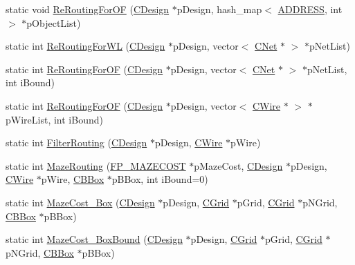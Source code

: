 \begin{DoxyCompactItemize}
\item 
static void \mbox{\hyperlink{classCGRouter_a1fd03b63f72447aa7085e3320ba6c7ff}{Re\+Routing\+For\+OF}} (\mbox{\hyperlink{classCDesign}{C\+Design}} $\ast$p\+Design, hash\+\_\+map$<$ \mbox{\hyperlink{BoxRouter_8h_a280feb883e9d4a7edcc69c8bcb9f38f2}{A\+D\+D\+R\+E\+SS}}, int $>$ $\ast$p\+Object\+List)
\item 
static int \mbox{\hyperlink{classCGRouter_a35bb814cd4191e640f1aecde4e5726ea}{Re\+Routing\+For\+WL}} (\mbox{\hyperlink{classCDesign}{C\+Design}} $\ast$p\+Design, vector$<$ \mbox{\hyperlink{classCNet}{C\+Net}} $\ast$ $>$ $\ast$p\+Net\+List)
\item 
static int \mbox{\hyperlink{classCGRouter_a57a58eb17ab26199bc5ec9d202ecdb80}{Re\+Routing\+For\+OF}} (\mbox{\hyperlink{classCDesign}{C\+Design}} $\ast$p\+Design, vector$<$ \mbox{\hyperlink{classCNet}{C\+Net}} $\ast$ $>$ $\ast$p\+Net\+List, int i\+Bound)
\item 
static int \mbox{\hyperlink{classCGRouter_a6f3bca0f272874e1ceb57fff94ddf921}{Re\+Routing\+For\+OF}} (\mbox{\hyperlink{classCDesign}{C\+Design}} $\ast$p\+Design, vector$<$ \mbox{\hyperlink{classCWire}{C\+Wire}} $\ast$ $>$ $\ast$p\+Wire\+List, int i\+Bound)
\item 
static int \mbox{\hyperlink{classCGRouter_ae04faf8e6971cdf55b7314471369e61e}{Filter\+Routing}} (\mbox{\hyperlink{classCDesign}{C\+Design}} $\ast$p\+Design, \mbox{\hyperlink{classCWire}{C\+Wire}} $\ast$p\+Wire)
\item 
static int \mbox{\hyperlink{classCGRouter_a4bbedf7ca84154f7c153874fb979c068}{Maze\+Routing}} (\mbox{\hyperlink{GRouter_8h_a7bce1c983b0974505feefa8727066acb}{F\+P\+\_\+\+M\+A\+Z\+E\+C\+O\+ST}} $\ast$p\+Maze\+Cost, \mbox{\hyperlink{classCDesign}{C\+Design}} $\ast$p\+Design, \mbox{\hyperlink{classCWire}{C\+Wire}} $\ast$p\+Wire, \mbox{\hyperlink{classCBBox}{C\+B\+Box}} $\ast$p\+B\+Box, int i\+Bound=0)
\item 
static int \mbox{\hyperlink{classCGRouter_a175e2e50a21411c968fdd51eb280615a}{Maze\+Cost\+\_\+\+Box}} (\mbox{\hyperlink{classCDesign}{C\+Design}} $\ast$p\+Design, \mbox{\hyperlink{classCGrid}{C\+Grid}} $\ast$p\+Grid, \mbox{\hyperlink{classCGrid}{C\+Grid}} $\ast$p\+N\+Grid, \mbox{\hyperlink{classCBBox}{C\+B\+Box}} $\ast$p\+B\+Box)
\item 
static int \mbox{\hyperlink{classCGRouter_ab46ca3eeaf6b0e08300d4fd6c067bb03}{Maze\+Cost\+\_\+\+Box\+Bound}} (\mbox{\hyperlink{classCDesign}{C\+Design}} $\ast$p\+Design, \mbox{\hyperlink{classCGrid}{C\+Grid}} $\ast$p\+Grid, \mbox{\hyperlink{classCGrid}{C\+Grid}} $\ast$p\+N\+Grid, \mbox{\hyperlink{classCBBox}{C\+B\+Box}} $\ast$p\+B\+Box)

\end{DoxyCompactItemize}
